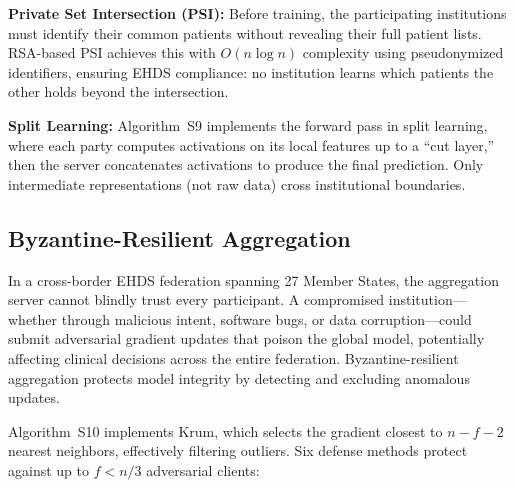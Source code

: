 \documentclass[conference]{IEEEtran}
\begin{document}
\textbf{Private Set Intersection (PSI):} Before training, the participating institutions must identify their common patients without revealing their full patient lists. RSA-based PSI achieves this with $O(n \log n)$ complexity using pseudonymized identifiers, ensuring EHDS compliance: no institution learns which patients the other holds beyond the intersection.

\textbf{Split Learning:} Algorithm~S9 implements the forward pass in split learning, where each party computes activations on its local features up to a ``cut layer,'' then the server concatenates activations to produce the final prediction. Only intermediate representations (not raw data) cross institutional boundaries.

\begin{figure}[htbp]
\centering
{}
\end{figure}

\subsection{Byzantine-Resilient Aggregation}

In a cross-border EHDS federation spanning 27 Member States, the aggregation server cannot blindly trust every participant. A compromised institution---whether through malicious intent, software bugs, or data corruption---could submit adversarial gradient updates that poison the global model, potentially affecting clinical decisions across the entire federation. Byzantine-resilient aggregation protects model integrity by detecting and excluding anomalous updates.

Algorithm~S10 implements Krum, which selects the gradient closest to $n{-}f{-}2$ nearest neighbors, effectively filtering outliers. Six defense methods protect against up to $f < n/3$ adversarial clients:
\end{document}
